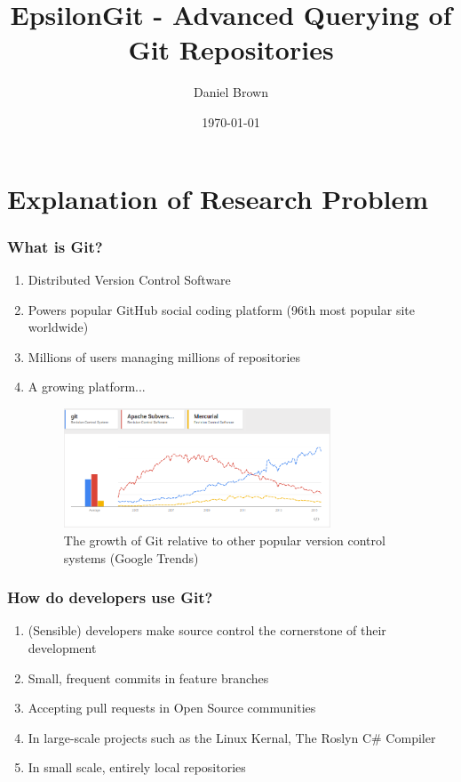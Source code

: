 \documentclass[aspectratio=1610]{beamer}
\title[EpsilonGit]{EpsilonGit - Advanced Querying of Git Repositories}
\author[DTB]{Daniel Brown}
\institute[UoY, CS]{The University of York, Department of Computer Science}
\date{\today}
\begin{document}
\frame{\titlepage}

\section{Explanation of Research Problem} %
\begin{frame}
\frametitle{What is Git?}
\begin{enumerate}
	\item Distributed Version Control Software
	\item Powers popular GitHub social coding platform (96th most popular site worldwide)
	\item Millions of users managing millions of repositories
	\item A growing platform...
	\begin{figure}[H]
		\centering
		\includegraphics[width=300px]{images/git-google-trends.png}
		\caption{The growth of Git relative to other popular version control systems (Google Trends)}
	\end{figure} 
\end{enumerate}
\end{frame}

\begin{frame}
\frametitle{How do developers use Git?}
\begin{enumerate}
	\item (Sensible) developers make source control the cornerstone of their development
	\item Small, frequent commits in feature branches
	\item Accepting pull requests in Open Source communities
	\item In large-scale projects such as the Linux Kernal, The Roslyn C\# Compiler
	\item In small scale, entirely local repositories
\end{enumerate}
\end{frame}
\end{document}
